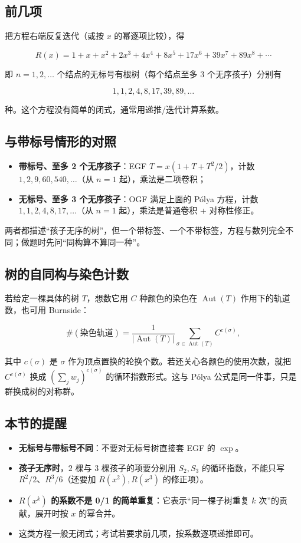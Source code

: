 \subsection{前几项}


把方程右端反复迭代（或按 $x$ 的幂逐项比较），得

\[
R(x)=1+x+x^2+2x^3+4x^4+8x^5+17x^6+39x^7+89x^8+\cdots
\]

即 $n=1,2,\dots$ 个结点的无标号有根树（每个结点至多 $3$ 个无序孩子）分别有

\[
1,1,2,4,8,17,39,89,\dots
\]

种。这个方程没有简单的闭式，通常用递推/迭代计算系数。

\subsection{与带标号情形的对照}


\begin{itemize}
\item \textbf{带标号、至多 2 个无序孩子}：EGF $T=x(1+T+T^2/2)$，计数 $1,2,9,60,540,\dots$（从 $n=1$ 起），乘法是二项卷积；
\item \textbf{无标号、至多 3 个无序孩子}：OGF 满足上面的 Pólya 方程，计数 $1,1,2,4,8,17,\dots$（从 $n=1$ 起），乘法是普通卷积 + 对称性修正。
\end{itemize}


两者都描述“孩子无序的树”，但一个带标签、一个不带标签，方程与数列完全不同；做题时先问“同构算不算同一种”。

\subsection{树的自同构与染色计数}


若给定一棵具体的树 $T$，想数它用 $C$ 种颜色的染色在 $\operatorname{Aut}(T)$ 作用下的轨道数，也可用 Burnside：

\[
\#(\text{染色轨道})=\frac{1}{|\operatorname{Aut}(T)|}
\sum_{\sigma\in\operatorname{Aut}(T)}C^{c(\sigma)},
\]

其中 $c(\sigma)$ 是 $\sigma$ 作为顶点置换的轮换个数。若还关心各颜色的使用次数，就把 $C^{c(\sigma)}$ 换成 $\left(\sum_j w_j\right)^{c(\sigma)}$ 的循环指数形式。这与 Pólya 公式是同一件事，只是群换成树的对称群。

\subsection{本节的提醒}


\begin{itemize}
\item \textbf{无标号与带标号不同}：不要对无标号树直接套 EGF 的 $\exp$。
\item \textbf{孩子无序时}，$2$ 棵与 $3$ 棵孩子的项要分别用 $S_2,S_3$ 的循环指数，不能只写 $R^2/2$、$R^3/6$（还要加 $R(x^2),R(x^3)$ 的修正项）。
\item \textbf{$R(x^k)$ 的系数不是 0/1 的简单重复}：它表示“同一棵子树重复 $k$ 次”的贡献，展开时按 $x$ 的幂合并。
\item 这类方程一般无闭式；考试若要求前几项，按系数逐项递推即可。
\end{itemize}

